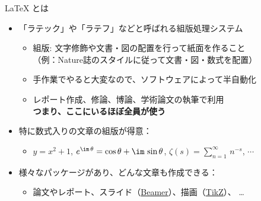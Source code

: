 \documentclass[dvipdfmx]{beamer}
\begin{document}
\begin{frame}[fragile,shrink=20]{\LaTeX{} とは}

    
\begin{itemize}
\item 「ラテック」や「ラテフ」などと呼ばれる組版処理システム
\begin{itemize}
    \item 組版: 文字修飾や文書・図の配置を行って紙面を作ること
    \\（例：Nature誌のスタイルに従って文書・図・数式を配置）
    \item 手作業でやると大変なので、ソフトウェアによって半自動化
    \item レポート作成、修論、博論、学術論文の執筆で利用
    \\\alert{\textbf{つまり、ここにいるほぼ全員が使う}}
\end{itemize}
%
\bigskip
\item 特に数式入りの文章の組版が得意：
    \begin{itemize}
        \item $y=x^2 + 1$, $e^{\im\,\theta} = \cos\theta + \im\,\sin\theta$, $\zeta(s) = \sum_{n=1}^\infty\,n^{-s}$, $\cdots$
    \end{itemize}
%
\bigskip
\item 様々なパッケージがあり、どんな文章も作成できる：
    \begin{itemize}
    \item 論文やレポート、スライド（\href{https://www.overleaf.com/learn/latex/Beamer}{Beamer}）、描画（\href{https://www.overleaf.com/learn/latex/TikZ_package}{TikZ}）、 \ldots
    \end{itemize}
\begin{center}
\qquad
{}
\end{center}
\end{itemize}
\end{frame}
\end{document}
